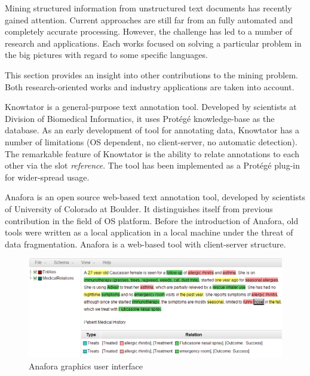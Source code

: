 
Mining structured information from unstructured text documents has recently gained attention. Current approaches are still 
far from an fully automated and completely accurate processing. However, the challenge has led to a number of research and 
applications. Each works focused on solving a particular problem in the big pictures with regard to some specific languages. 

This section provides an insight into other contributions to the mining problem. Both research-oriented works and 
industry applications are taken into account.

Knowtator is a general-purpose text annotation tool. Developed by scientists at Division of Biomedical Informatics, 
it uses Protégé knowledge-base as the database. As an early development of tool for annotating data, Knowtator has 
a number of limitations (OS dependent, no client-server, no automatic detection). The remarkable feature of Knowtator
is the ability to relate annotations to each other via the slot \textit{reference}.  The tool has been implemented as
a Protégé plug-in for wider-spread usage.



Anafora is an open source web-based text annotation tool, developed by scientists of  University of Colorado at Boulder. It 
distinguishes itself from previous contribution in the field of OS platform. Before the introduction of Anafora, old tools 
were written as a local application in a local machine under the threat of data fragmentation. Anafora is a web-based tool 
with client-server structure. %

\begin{figure}[!htb]
	\centering
	\includegraphics[width=\textwidth]{Images/anafora}
	\caption{Anafora graphics user interface}
	\label{fig:First}
\end{figure}


